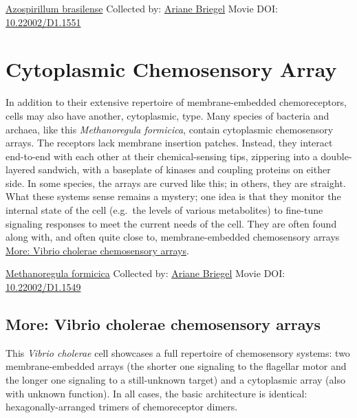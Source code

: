 \documentclass[]{tufte-book}
\begin{document}
\hypertarget{htmlwidget-48931e1ea5a3f1038616}{}

\label{fig:7-4a}\protect\hyperlink{tree}{Azospirillum brasilense} Collected by: \protect\hyperlink{ariane_briegel}{Ariane Briegel} Movie DOI: \href{https://doi.org/10.22002/D1.1551}{10.22002/D1.1551}

\hypertarget{cytoplasmic-chemosensory-array}{%
\section{Cytoplasmic Chemosensory Array}\label{cytoplasmic-chemosensory-array}}

In addition to their extensive repertoire of membrane-embedded chemoreceptors, cells may also have another, cytoplasmic, type. Many species of bacteria and archaea, like this \emph{Methanoregula formicica}, contain cytoplasmic chemosensory arrays. The receptors lack membrane insertion patches. Instead, they interact end-to-end with each other at their chemical-sensing tips, zippering into a double-layered sandwich, with a baseplate of kinases and coupling proteins on either side. In some species, the arrays are curved like this; in others, they are straight. What these systems sense remains a mystery; one idea is that they monitor the internal state of the cell (e.g.~the levels of various metabolites) to fine-tune signaling responses to meet the current needs of the cell. They are often found along with, and often quite close to, membrane-embedded chemosensory arrays \protect\hyperlink{Vibrio_cholerae_chemosensory_arrays}{More: Vibrio cholerae chemosensory arrays}.



\hypertarget{htmlwidget-5bf27a887e08a3de0fbd}{}

\label{fig:7-5}\protect\hyperlink{tree}{Methanoregula formicica} Collected by: \protect\hyperlink{ariane_briegel}{Ariane Briegel} Movie DOI: \href{https://doi.org/10.22002/D1.1549}{10.22002/D1.1549}

\hypertarget{Vibrio_cholerae_chemosensory_arrays}{%
\subsection*{More: Vibrio cholerae chemosensory arrays}\label{Vibrio_cholerae_chemosensory_arrays}}

This \emph{Vibrio cholerae} cell showcases a full repertoire of chemosensory systems: two membrane-embedded arrays (the shorter one signaling to the flagellar motor and the longer one signaling to a still-unknown target) and a cytoplasmic array (also with unknown function). In all cases, the basic architecture is identical: hexagonally-arranged trimers of chemoreceptor dimers.
\end{document}
